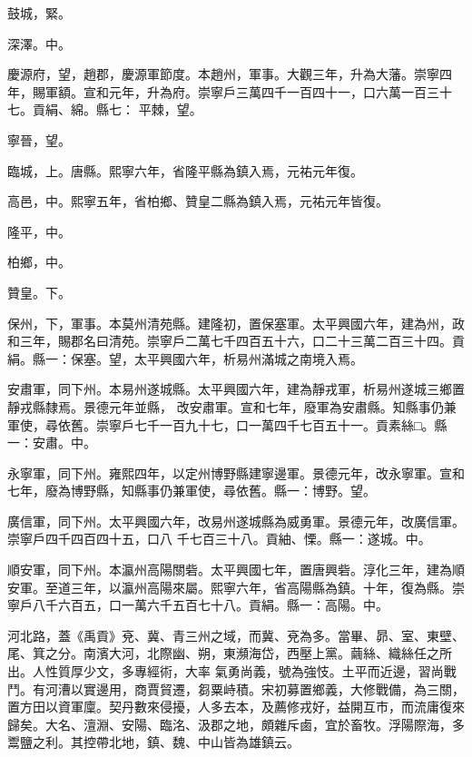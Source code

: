\begin{pinyinscope}
 鼓城，緊。



 深澤。中。



 慶源府，望，趙郡，慶源軍節度。本趙州，軍事。大觀三年，升為大藩。崇寧四年，賜軍額。宣和元年，升為府。崇寧戶三萬四千一百四十一，口六萬一百三十七。貢絹、綿。縣七：
 平棘，望。



 寧晉，望。



 臨城，上。唐縣。熙寧六年，省隆平縣為鎮入焉，元祐元年復。



 高邑，中。熙寧五年，省柏鄉、贊皇二縣為鎮入焉，元祐元年皆復。



 隆平，中。



 柏鄉，中。



 贊皇。下。



 保州，下，軍事。本莫州清苑縣。建隆初，置保塞軍。太平興國六年，建為州，政和三年，賜郡名曰清苑。崇寧戶二萬七千四百五十六，口二十三萬二百三十四。貢絹。縣一：保塞。望，太平興國六年，析易州滿城之南境入焉。



 安肅軍，同下州。本易州遂城縣。太平興國六年，建為靜戎軍，析易州遂城三鄉置靜戎縣隸焉。景德元年並縣，
 改安肅軍。宣和七年，廢軍為安肅縣。知縣事仍兼軍使，尋依舊。崇寧戶七千一百九十七，口一萬四千七百五十一。貢素絲□。縣一：安肅。中。



 永寧軍，同下州。雍熙四年，以定州博野縣建寧邊軍。景德元年，改永寧軍。宣和七年，廢為博野縣，知縣事仍兼軍使，尋依舊。縣一：博野。望。



 廣信軍，同下州。太平興國六年，改易州遂城縣為威勇軍。景德元年，改廣信軍。崇寧戶四千四百四十五，口八
 千七百三十八。貢紬、慄。縣一：遂城。中。



 順安軍，同下州。本瀛州高陽關砦。太平興國七年，置唐興砦。淳化三年，建為順安軍。至道三年，以瀛州高陽來屬。熙寧六年，省高陽縣為鎮。十年，復為縣。崇寧戶八千六百五，口一萬六千五百七十八。貢絹。縣一：高陽。中。



 河北路，蓋《禹貢》兗、冀、青三州之域，而冀、兗為多。當畢、昴、室、東壁、尾、箕之分。南濱大河，北際幽、朔，東瀕海岱，西壓上黨。繭絲、織絲任之所出。人性質厚少文，多專經術，大率
 氣勇尚義，號為強忮。土平而近邊，習尚戰鬥。有河漕以實邊用，商賈貿遷，芻粟峙積。宋初募置鄉義，大修戰備，為三關，置方田以資軍廩。契丹數來侵擾，人多去本，及薦修戎好，益開互市，而流庸復來歸矣。大名、澶淵、安陽、臨洺、汲郡之地，頗雜斥鹵，宜於畜牧。浮陽際海，多鬻鹽之利。其控帶北地，鎮、魏、中山皆為雄鎮云。




\end{pinyinscope}
